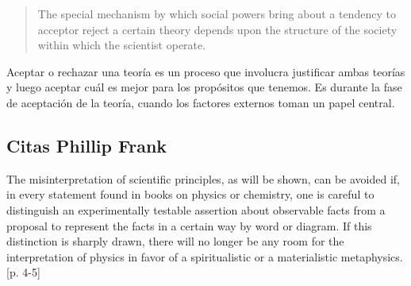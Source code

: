 \begin{quote}
The special mechanism by which social powers bring about a tendency to acceptor reject a certain theory depends upon the structure of the society within which the scientist operate. \parencite[p. 143][]{Frank1954}
\end{quote}

Aceptar o rechazar una teoría es un proceso que involucra justificar ambas teorías y luego aceptar cuál es mejor para los propósitos que tenemos.
Es durante la fase de aceptación de la teoría, cuando los factores externos toman un papel central. 













\subsection{Citas Phillip Frank}

The misinterpretation of scientific principles, as will be shown, can be avoided if, in every statement found in books on physics or chemistry, one is careful to distinguish an experimentally testable assertion  about observable facts from a proposal to represent the facts in a certain way by word or diagram.
If this distinction is sharply drawn, there will no longer be any room for the interpretation of physics in favor of a spiritualistic or a materialistic metaphysics. [p. 4-5]

